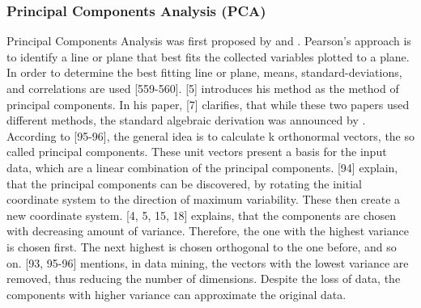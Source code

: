 \subsubsection{Principal Components Analysis (PCA)}
Principal Components Analysis was first proposed by \textcite{OnLinesAndPlanes1901} and \textcite{hotelling1933analysis}.
Pearson's approach is to identify a line or plane that best fits the collected variables plotted to a plane. In order to determine the best fitting line or plane, means, standard-deviations, and correlations are used \autocite{OnLinesAndPlanes1901}[559-560].
\textcite{hotelling1933analysis}[5] introduces his method as the method of principal components. In his paper, \textcite{jolliffe2002PCA}[7] clarifies, that while these two papers used different methods, the standard algebraic
derivation was announced by \textcite{hotelling1933analysis}. According to \textcite{han2011data}[95-96], the general idea is to calculate k orthonormal vectors, the so called principal components. These unit vectors present a basis for the input data, which are a linear combination of the principal components. \textcite{DataMiningAndPredictiveAnalytics}[94] explain, that the principal components can be discovered, by rotating the initial coordinate system to the direction of maximum variability. These then create a new coordinate system. \textcite{hotelling1933analysis}[4, 5, 15, 18] explains, that the components are chosen with decreasing amount of variance. Therefore, the one with the highest variance is chosen first. The next highest is chosen orthogonal to the one before, and so on. \textcite{han2011data}[93, 95-96] mentions, in data mining, the vectors with the lowest variance are removed, thus reducing the number of dimensions. Despite the loss of data, the components with higher variance can approximate the original data.






